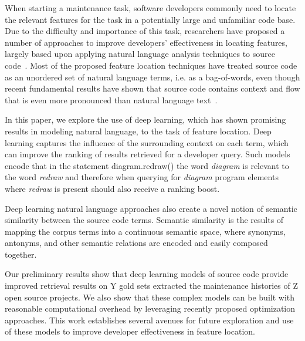 
% 
%
When starting a maintenance task, software developers commonly need to
locate the relevant features for the task in a potentially large and
unfamiliar code base. Due to the difficulty and importance of this
task, researchers have proposed a number of approaches to improve
developers' effectiveness in locating features, largely based upon
applying natural language analysis techniques to source
code~\cite{dit_feature_2013}. Most of the proposed feature location
techniques have treated source code as an unordered set of natural
language terms, i.e. as a bag-of-words, even though recent fundamental
results have shown that source code contains context and flow that is
even more pronounced than natural language
text~\cite{hindle_naturalness_2012}.


%
%
In this paper, we explore the use of deep learning, which has shown
promising results in modeling natural language, to the task of feature
location. Deep learning captures the influence of the surrounding
context on each term, which can improve the ranking of results
retrieved for a developer query. Such models encode that in the
statement {\sf diagram.redraw()} the word {\em diagram} is relevant
to the word {\em redraw} and therefore when querying for {\em
diagram} program elements where {\em redraw} is present should also
receive a ranking boost.

Deep learning natural language approaches also create a novel notion
of semantic similarity between the source code terms. Semantic
similarity is the results of mapping the corpus terms into a
continuous semantic space, where synonyms, antonyms, and other
semantic relations are encoded and easily composed together.



%
%

Our preliminary results show that deep learning models of source code
provide improved retrieval results on Y gold sets extracted the
maintenance histories of Z open source projects. We also show that these
complex models can be built with reasonable computational overhead by
leveraging recently proposed optimization approaches. This work
establishes several avenues for future exploration and use of these
models to improve developer effectiveness in feature location.



